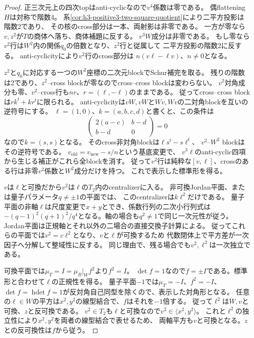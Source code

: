 \begin{proof}
正三次元上の四次topはanti-cyclicなので$v^4$係数は零である。
偶flattening$H$は対称で階数4。
系\ref{cor:h3-positive3-two-square-quotient}により二平方投影は階数2であり、
その核のcross部分は一本、両射影は非零である。
一方が零なら$v,z^2$が$T$の商体へ落ち、商体補題に反する。
$v^3W$成分は非零である。
もし零なら$v^2$行は$W^2$内の関係$q_0$の倍数となり、$z^2$行と従属して
二平方投影の階数2に反する。
anti-cyclicityにより$v^2$行のcross部分は
$n(v\ell-\ell v)$、$n\ne0$となる。

$z^2$と$q_0$に対応する一つの$W^2$座標の二次元blockでSchur補完を取る。
残りの階数は2であり、$z^2$--cross blockが零なのでcross--cross blockは変わらない。
$v^2$対角成分も零、$v^2$--cross行も$nr$、$r=(\ell,-\ell)$のままである。
従ってcross--cross blockは$r k^t+k r^t$に限られる。
anti-cyclicityは$vW,vW$と$Wv,Wv$の二対角blockを互いの逆符号にする。
$\ell=(1,0)$、$k=(a,b,c,d)$と書くと、この条件は
\[
 \begin{pmatrix}2(a-c)&b-d\\b-d&0\end{pmatrix}=0
\]
なので$k=(s,s)$となる。
そのcross非対角blockは$\ell s^t-s\ell^t$、
$v^2$--$W^2$ blockはその逆符号である。
$v_{\mathrm{old}}=v_{\mathrm{new}}-s/n$という基底変更で、
$v^3\ell$のanti-cyclic四項から生じる補正がこれら全blockを消す。
従って$v^2$行は純粋な$[v,\ell]$、crossのある行は非零$v^2$係数と$W^2$成分だけを持つ。
これで表示した標準形を得る。

$v$は$\ell$と可換だから$v^2$は$\ell$の$T_2$内のcentralizerに入る。
非可換Jordan平面、または量子パラメータ$q\ne\pm1$の平面では、
このcentralizerは$k\ell^2$だけである。
量子平面の非軸$\ell$は尺度変更で$x+y$とでき、係数行列の二次小行列式は
$-(q-1)^2(q+1)^2/q^4$となる。軸の場合も$q^2\ne1$で同じ一次元性が従う。
Jordan平面は正規軸とそれ以外の二場合の直接交換子計算による。
従ってこれらの平面では$v^2=c\ell^2$となり、$v$と$\ell$が可換するため
代数閉体上で平方差が一次因子へ分解して整域性に反する。
同じ理由で、残る場合でも$v^2,\ell^2$は一次独立である。

可換平面では$\mu_T=I=\mu_B|_Wf^2$より$f^2=I$。
$\det f=1$なので$f=\pm I$である。標準形と合わせて$\ell$の正規性を得る。
量子平面$-1$では$\mu_T=-I$、$f^2=-I$、
$\det f=\operatorname{hdet}f=1$が反対角自己同型を除くので、表示した対角形となる。
任意の$\ell\in W$の平方は$x^2,y^2$の線型結合で、$f$はそれを$-1$倍する。
従って$\ell^2$は$W,v$と可換、$z$と反可換である。
$v^2\in T_2$も$\ell$と可換なので$v^2\in\langle x^2,y^2\rangle$。
これと$\ell^2$の独立性により$x^2,y^2$を両者の線型結合で表せるため、
両軸平方も$v$と可換となる。$z$との反可換性は$f$から従う。
\end{proof}


